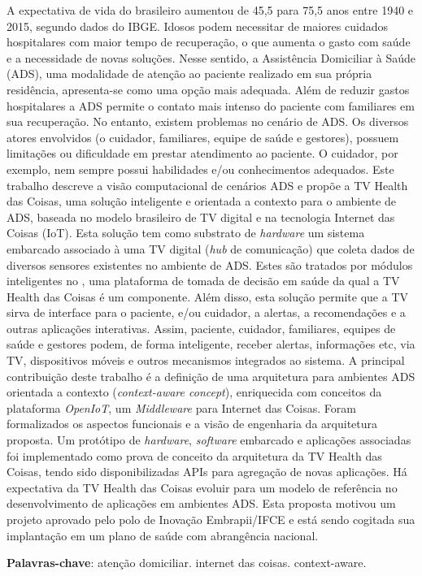 \setlength{\absparsep}{18pt} %
\begin{resumo}

A expectativa de vida do brasileiro aumentou de 45,5 para 75,5 anos entre 1940
e 2015, segundo dados do IBGE. Idosos podem necessitar de maiores cuidados
hospitalares com maior tempo de recuperação, o que aumenta o gasto com saúde e
a necessidade de novas soluções.  Nesse sentido, a Assistência Domiciliar à
Saúde (ADS), uma modalidade de atenção ao paciente realizado em sua própria
residência, apresenta-se como uma opção mais adequada. Além de reduzir gastos
hospitalares a ADS permite o contato mais intenso do paciente com familiares em
sua recuperação.  No entanto, existem problemas no cenário de ADS. Os diversos
atores envolvidos (o cuidador, familiares, equipe de saúde e gestores), possuem
limitações ou dificuldade em prestar atendimento ao paciente. O cuidador, por
exemplo, nem sempre possui habilidades e/ou conhecimentos adequados. Este
trabalho descreve a visão computacional de cenários ADS e propõe a TV Health
das Coisas, uma solução inteligente e orientada a contexto para o ambiente de
ADS, baseada no modelo brasileiro de TV digital e na tecnologia Internet das
Coisas (IoT). Esta solução tem como substrato de \textit{hardware} um sistema embarcado
associado à uma TV digital (\textit{hub} de comunicação) que coleta dados de
diversos sensores existentes no ambiente de ADS. Estes são tratados por módulos
inteligentes no  \nextsaude, uma plataforma de tomada de decisão em saúde da
qual a TV Health das Coisas é um componente. Além disso, esta solução permite
que a TV sirva de interface para o paciente, e/ou cuidador, a alertas, a
recomendações e a outras aplicações interativas.  Assim, paciente, cuidador,
familiares, equipes de saúde e gestores podem, de forma inteligente, receber
alertas, informações etc, via TV, dispositivos móveis e outros mecanismos
integrados ao sistema.  A principal contribuição deste trabalho é a definição
de uma arquitetura para ambientes ADS orientada a contexto
(\textit{context-aware concept}), enriquecida com conceitos da plataforma
\textit{OpenIoT}, um \textit{Middleware} para Internet das Coisas. Foram
formalizados os aspectos funcionais e a visão de engenharia da arquitetura
proposta.  Um protótipo de \textit{hardware}, \textit{software} embarcado e
aplicações associadas foi implementado como prova de conceito da arquitetura da
TV Health das Coisas, tendo sido disponibilizadas APIs para agregação de novas
aplicações.  Há expectativa da TV Health das Coisas evoluir para um modelo de
referência no desenvolvimento de aplicações em ambientes ADS. Esta proposta
motivou um projeto aprovado pelo polo de Inovação Embrapii/IFCE e está sendo
cogitada sua implantação em um plano de saúde com abrangência nacional.

 \textbf{Palavras-chave}: atenção domiciliar. internet das coisas. context-aware.
 \end{resumo}
